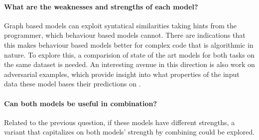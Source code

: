 \documentclass[sigconf,authordraft=true,nonacm=true]{acmart}
\begin{document}
\paragraph{What are the weaknesses and strengths of each model?}
  Graph based models can exploit syntatical similarities taking hints from the programmer, which behaviour based models cannot. There are indications that this makes behaviour based models better for complex code that is algorithmic in nature.
  To explore this, a comparision of state of the art models for both tasks on the same dataset is needed.
  An interesting avenue in this direction is also work on adversarial examples, which provide insight into what properties of the input data these model bases their predictions on \cite{zhang_generating_2020,yefet_adversarial_2020,ramakrishnan_semantic_2020,bielik_adversarial_2020}.
\paragraph{Can both models be useful in combination?}
  Related to the previous question, if these models have different strengths, a variant that capitalizes on both models' strength by combining could be explored.

\clearpage



\end{document}
